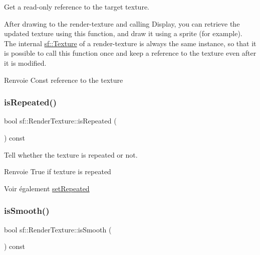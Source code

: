 Get a read-\/only reference to the target texture. 

After drawing to the render-\/texture and calling Display, you can retrieve the updated texture using this function, and draw it using a sprite (for example). The internal \hyperlink{classsf_1_1Texture}{sf\+::\+Texture} of a render-\/texture is always the same instance, so that it is possible to call this function once and keep a reference to the texture even after it is modified.

\begin{DoxyReturn}{Renvoie}
Const reference to the texture 
\end{DoxyReturn}
\mbox{\label{classsf_1_1RenderTexture_a81c5a453a21c7e78299b062b97dc8c87}} 
\subsubsection{\texorpdfstring{is\+Repeated()}{isRepeated()}}
{\footnotesize\ttfamily bool sf\+::\+Render\+Texture\+::is\+Repeated (\begin{DoxyParamCaption}{ }\end{DoxyParamCaption}) const}



Tell whether the texture is repeated or not. 

\begin{DoxyReturn}{Renvoie}
True if texture is repeated
\end{DoxyReturn}
\begin{DoxySeeAlso}{Voir également}
\hyperlink{classsf_1_1RenderTexture_af8f97b33512bf7d5b6be3da6f65f7365}{set\+Repeated} 
\end{DoxySeeAlso}
\mbox{\label{classsf_1_1RenderTexture_a5b43c007ab6643accc5dae84b5bc8f61}} 
\subsubsection{\texorpdfstring{is\+Smooth()}{isSmooth()}}
{\footnotesize\ttfamily bool sf\+::\+Render\+Texture\+::is\+Smooth (\begin{DoxyParamCaption}{ }\end{DoxyParamCaption}) const}



